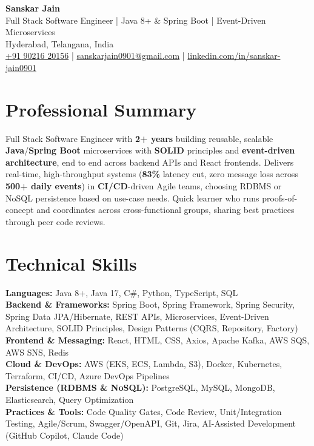 \documentclass[a4paper,10pt]{article}
\begin{document}
\begin{center}
    {\LARGE \textbf{Sanskar Jain}} \\
    \vspace{2pt}
    Full Stack Software Engineer \;|\; Java 8+ \& Spring Boot \;|\; Event-Driven Microservices \\
    \vspace{2pt}
    Hyderabad, Telangana, India \\
    \href{tel:+919021620156}{+91 90216 20156} \;|\;
    \href{mailto:sanskarjain0901@gmail.com}{sanskarjain0901@gmail.com} \;|\;
    \href{https://www.linkedin.com/in/sanskar-jain0901/}{linkedin.com/in/sanskar-jain0901}
\end{center}

\section*{Professional Summary}
Full Stack Software Engineer with \textbf{2+ years} building reusable, scalable \textbf{Java}/\textbf{Spring Boot} microservices with \textbf{SOLID} principles and \textbf{event-driven architecture}, end to end across backend APIs and React frontends.
Delivers real-time, high-throughput systems (\textbf{83\%} latency cut, zero message loss across \textbf{500+ daily events}) in \textbf{CI/CD}-driven Agile teams, choosing RDBMS or NoSQL persistence based on use-case needs.
Quick learner who runs proofs-of-concept and coordinates across cross-functional groups, sharing best practices through peer code reviews.

\section*{Technical Skills}
\begin{sloppypar}
\noindent
\textbf{Languages:} Java 8+, Java 17, C\#, Python, TypeScript, SQL \\
\textbf{Backend \& Frameworks:} Spring Boot, Spring Framework, Spring Security, Spring Data JPA/Hibernate, REST APIs, Microservices, Event-Driven Architecture, SOLID Principles, Design Patterns (CQRS, Repository, Factory) \\
\textbf{Frontend \& Messaging:} React, HTML, CSS, Axios, Apache Kafka, AWS SQS, AWS SNS, Redis \\
\textbf{Cloud \& DevOps:} AWS (EKS, ECS, Lambda, S3), Docker, Kubernetes, Terraform, CI/CD, Azure DevOps Pipelines \\
\textbf{Persistence (RDBMS \& NoSQL):} PostgreSQL, MySQL, MongoDB, Elasticsearch, Query Optimization \\
\textbf{Practices \& Tools:} Code Quality Gates, Code Review, Unit/Integration Testing, Agile/Scrum, Swagger/OpenAPI, Git, Jira, AI-Assisted Development (GitHub Copilot, Claude Code)
\end{sloppypar}
\end{document}
